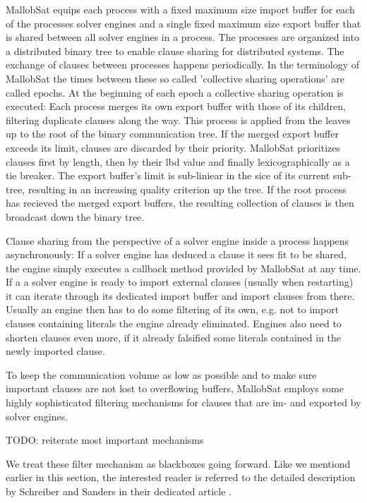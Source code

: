 \documentclass[12pt,a4paper,twoside]{scrartcl}
\numberwithin{equation}{section}
\begin{document}
MallobSat equips each process with a fixed maximum size import buffer for each of the processes solver engines and a single fixed maximum size export buffer that is shared between all solver engines in a process. The processes are organized into a distributed binary tree to enable clause sharing for distributed systems. The exchange of clauses between processes happens periodically. In the terminology of MallobSat the times between these so called 'collective sharing operations' are called epochs.
At the beginning of each epoch a collective sharing operation is executed: Each process merges its own export buffer with those of its children, filtering duplicate clauses along the way. This process is applied from the leaves up to the root of the binary communication tree. If the merged export buffer exceeds its limit, clauses are discarded by their priority. MallobSat prioritizes clauses first by length, then by their lbd value and finally lexicographically as a tie breaker. The export buffer's limit is sub-liniear in the sice of its current sub-tree, resulting in an increasing quality criterion up the tree. If the root process has recieved the merged export buffers, the resulting collection of clauses is then broadcast down the binary tree.

Clause sharing from the perspective of a solver engine inside a process happens asynchronously: If a solver engine has deduced a clause it sees fit to be shared, the engine simply executes a callback method provided by MallobSat at any time. If a a solver engine is ready to import external clauses (usually when restarting) it can iterate through its dedicated import buffer and import clauses from there. Usually an engine then has to do some filtering of its own, e.g. not to import clauses containing literals the engine already eliminated. Engines also need to shorten clauses even more, if it already falsified some literals contained in the newly imported clause.

To keep the communication volume as low as possible and to make sure important clauses are not lost to overflowing buffers, MallobSat employs some highly sophisticated filtering mechanisms for clauses that are im- and exported by solver engines. 

TODO: reiterate most important mechanisms

We treat these filter mechanism as blackboxes going forward. Like we mentiond earlier in this section, the interested reader is referred to the detailed description by Schreiber and Sanders in their dedicated article \cite{mallobSat}.
\end{document}
